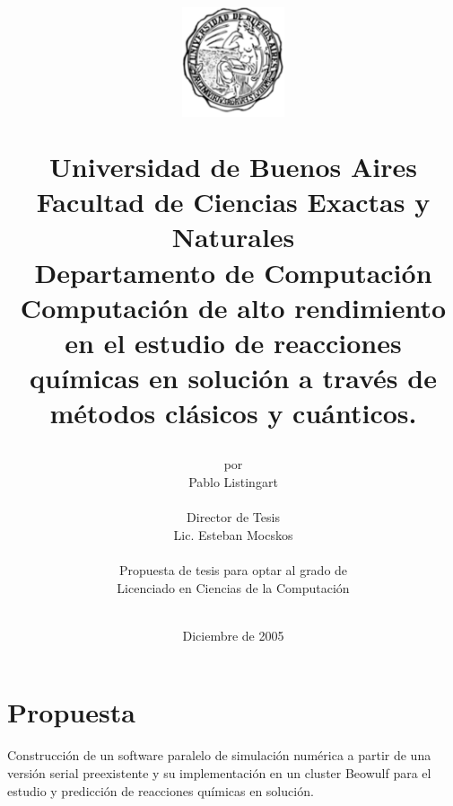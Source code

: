 \documentclass[a4paper, 12pt]{article}
\begin{document}

\title {
\begin{figure}[h]
\begin{center}
\includegraphics[keepaspectratio, width=3cm]{escudo}
\end{center}
\end{figure}
Universidad de Buenos Aires\\
Facultad de Ciencias Exactas y Naturales\\
Departamento de Computaci\'on\\
\vspace{10mm}
\Huge\textbf{Computaci\'on de alto rendimiento en el estudio de reacciones qu\'imicas en soluci\'on
a trav\'es de m\'etodos cl\'asicos y cu\'anticos.}
\vspace{10mm}
}

\author{por \\
    Pablo Listingart\\
        \\
        Director de Tesis\\
        Lic. Esteban Mocskos\\
        \\
        Propuesta de tesis para optar al grado de \\
        Licenciado en Ciencias de la Computaci\'on\\
        \\
        }
\date{Diciembre de 2005}

\maketitle

\pagebreak

\section*{Propuesta}

Construcci\'on de un software paralelo de simulaci\'on num\'erica a partir de una versi\'on serial preexistente y su implementaci\'on en un cluster Beowulf para el estudio y predicci\'on de reacciones qu\'imicas en soluci\'on.
\end{document}
